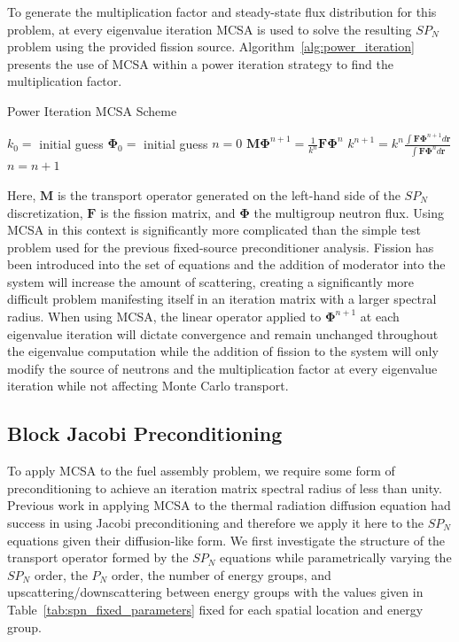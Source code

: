 To generate the multiplication factor and steady-state flux
distribution for this problem, at every eigenvalue iteration MCSA is
used to solve the resulting $SP_N$ problem using the provided fission
source. Algorithm~\ref{alg:power_iteration} presents the use of MCSA
within a power iteration strategy to find the multiplication factor.
\begin{algorithm}[h!]
  \caption{Power Iteration MCSA Scheme}
  \label{alg:power_iteration}
  \begin{algorithmic}
    \State $k_0 =$ initial guess
    \State $\mathbf{\Phi}_0 =$ initial guess
    \State $n = 0$
    \State $\mathbf{M} \mathbf{\Phi}^{n+1} = \frac{1}{k^n} \mathbf{F} \mathbf{\Phi}^n$
    \State $k^{n+1} = k^n \frac{\int \mathbf{F} \mathbf{\Phi}^{n+1} d\mathbf{r}}{\int
      \mathbf{F} \mathbf{\Phi}^n d\mathbf{r}}$
    \State $n = n+1$
    \EndWhile
  \end{algorithmic}
\end{algorithm}
Here, $\mathbf{M}$ is the transport operator generated on the
left-hand side of the $SP_N$ discretization, $\mathbf{F}$ is the
fission matrix, and $\mathbf{\Phi}$ the multigroup neutron flux. Using
MCSA in this context is significantly more complicated than the simple
test problem used for the previous fixed-source preconditioner
analysis. Fission has been introduced into the set of equations and
the addition of moderator into the system will increase the amount of
scattering, creating a significantly more difficult problem
manifesting itself in an iteration matrix with a larger spectral
radius. When using MCSA, the linear operator applied to
$\mathbf{\Phi}^{n+1}$ at each eigenvalue iteration will dictate
convergence and remain unchanged throughout the eigenvalue computation
while the addition of fission to the system will only modify the
source of neutrons and the multiplication factor at every eigenvalue
iteration while not affecting Monte Carlo transport.
 
\subsection{Block Jacobi Preconditioning}
\label{subsec:spn_spectral_analysis}
To apply MCSA to the fuel assembly problem, we require some form of
preconditioning to achieve an iteration matrix spectral radius of less
than unity. Previous work in applying MCSA to the thermal radiation
diffusion equation had success in using Jacobi preconditioning
\cite{evans_monte_2012} and therefore we apply it here to the $SP_N$
equations given their diffusion-like form. We first investigate the
structure of the transport operator formed by the $SP_N$ equations
while parametrically varying the $SP_N$ order, the $P_N$ order, the
number of energy groups, and upscattering/downscattering between
energy groups with the values given in
Table~\ref{tab:spn_fixed_parameters} fixed for each spatial location
and energy group.

